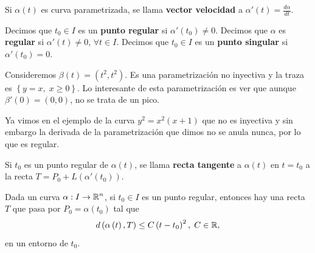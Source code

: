 \begin{definition}
Si $\displaystyle \alpha\left(t\right) $ es curva parametrizada, se llama \textbf{vector velocidad} a $\displaystyle \alpha'\left(t\right)=\frac{d\alpha }{dt} $. 
\end{definition}
\begin{definition}
Decimos que $\displaystyle t_{0}\in I $ es un \textbf{punto regular} si $\displaystyle \alpha'\left(t_{0}\right)\neq 0 $. Decimos que $\displaystyle \alpha  $ es \textbf{regular} si $\displaystyle \alpha'\left(t\right)\neq 0 $, $\displaystyle \forall t \in I $. Decimos que $\displaystyle t_{0} \in I $ es un \textbf{punto singular} si $\displaystyle \alpha'\left(t_{0}\right)=0 $.
\end{definition}

\begin{eg}
	Consideremos $\displaystyle \beta\left(t\right)=\left(t ^{2}, t ^{2}\right) $. Es una parametrización no inyectiva y la traza es $\displaystyle \left\{ y = x, \; x \geq 0\right\}  $. Lo interesante de esta parametrización es ver que aunque $\displaystyle \beta'\left(0\right)=\left(0,0\right) $, no se trata de un pico.
\end{eg}
\begin{observation}
Ya vimos en el ejemplo de la curva $\displaystyle y^{2} = x^{2}\left(x + 1\right) $ que no es inyectiva y sin embargo la derivada de la parametrización que dimos no se anula nunca, por lo que es regular. 
\end{observation}
\begin{definition}
Si $\displaystyle t_{0} $ es un punto regular de $\displaystyle \alpha\left(t\right) $, se llama \textbf{recta tangente} a $\displaystyle \alpha\left(t\right) $ en $\displaystyle t = t_{0} $ a la recta $\displaystyle T = P_{0}+L\left(\alpha'\left(t_{0}\right)\right) $. 
\end{definition}
\begin{prop}
Dada un curva $\displaystyle \alpha : I \to \mathbb{R}^{n} $, si $\displaystyle t_{0} \in I $ es un punto regular, entonces hay una recta $\displaystyle T $ que pasa por $\displaystyle P_{0}=\alpha\left(t_{0}\right) $ tal que 
\[d\left(\alpha\left(t\right), T\right)\leq C\left(t-t_{0}\right)^{2} , \; C \in \mathbb{R},\]
en un entorno de $\displaystyle t_{0} $. 
\end{prop}
